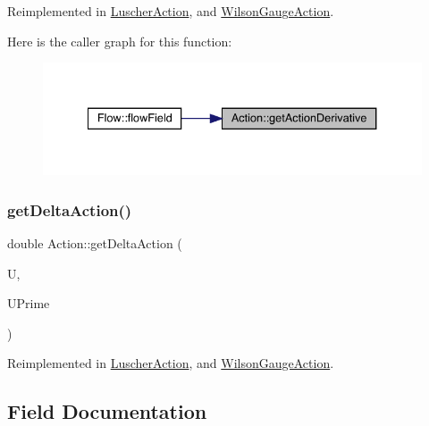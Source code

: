 Reimplemented in \mbox{\hyperlink{class_luscher_action_ac11785b2df276816a098a87e6ac514c7}{Luscher\+Action}}, and \mbox{\hyperlink{class_wilson_gauge_action_a43cf939cd53495b7225fbeaa8a0ff6e8}{Wilson\+Gauge\+Action}}.

Here is the caller graph for this function\+:\nopagebreak
\begin{figure}[H]
\begin{center}
\leavevmode
\includegraphics[width=334pt]{class_action_a78168dd7c3819a3365e28fc1aae1b9b6_icgraph}
\end{center}
\end{figure}
\mbox{\label{class_action_a9409aad86cbfe3b6ec25bf5a837eaea5}} 
\subsubsection{\texorpdfstring{getDeltaAction()}{getDeltaAction()}}
{\footnotesize\ttfamily double Action\+::get\+Delta\+Action (\begin{DoxyParamCaption}\item[{\mbox{\hyperlink{class_s_u3}{S\+U3}}}]{U,  }\item[{\mbox{\hyperlink{class_s_u3}{S\+U3}}}]{U\+Prime }\end{DoxyParamCaption})\hspace{0.3cm}{\ttfamily [virtual]}}



Reimplemented in \mbox{\hyperlink{class_luscher_action_a1955f8eea8b0771f6c737c39e3fc11b2}{Luscher\+Action}}, and \mbox{\hyperlink{class_wilson_gauge_action_a60f2892e61489004df3cde6cc856b00b}{Wilson\+Gauge\+Action}}.



\subsection{Field Documentation}
\mbox{\label{class_action_a80654d2311707f24689cd9e480edb2f6}} 
